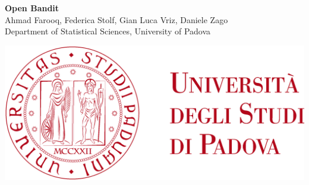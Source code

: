 \documentclass[a0,portrait]{a0poster}
\begin{document}


\begin{minipage}[c]{0.75\linewidth}
\huge \color{DarkRed} \textbf{Open Bandit }\\[0.5cm]  \color{Black} %
\Large Ahmad Farooq, Federica Stolf, Gian Luca Vriz, Daniele Zago\\[0.5cm] %
\Large Department of Statistical Sciences, University of Padova \\[0.5cm]
\end{minipage}
%
\begin{minipage}[c]{0.25\linewidth}
\includegraphics[scale=0.2]{logo_unipd}
\end{minipage}

\vspace{1cm} %

\end{document}

